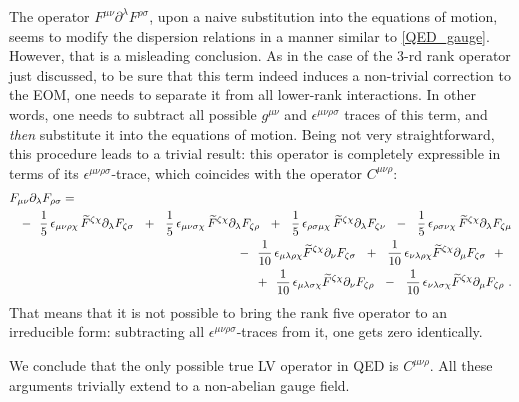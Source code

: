\documentclass[12pt]{revtex4}
\newcommand{\p}{\partial}
\newcommand{\wt}{\widetilde}
\begin{document}
	The operator
$ F^{\mu\nu} \partial^\lambda F^{\rho\sigma} $,
	upon a naive substitution
	into the equations of motion, 
	seems to modify the dispersion relations in a manner similar to \eqref{QED_gauge}.
	However, that is a misleading conclusion.
	As in the case of the 3-rd rank operator just discussed,
	to be sure that this term indeed induces a non-trivial 
	correction to the EOM, one needs to separate it from all
	lower-rank interactions.
	In other words, one needs to subtract all possible 
	$ g^{\mu\nu} $ and $ \epsilon^{\mu\nu\rho\sigma} $ 
	traces of this term, and {\it then} substitute it into the
	equations of motion.
	Being not very straightforward, this procedure leads to a 
	trivial result: this operator is completely expressible
	in terms of its $ \epsilon^{\mu\nu\rho\sigma} $-trace, which
	coincides with the operator $ C^{\mu\nu\rho} $:
\begin{eqnarray*}
\lefteqn{
	F_{\mu\nu} \p_\lambda F_{\rho\sigma} = 
	} &&
	\\
	&&
	-~~ 
	\frac{1}{5}\,\epsilon_{\mu\nu\rho\chi} \,
	\wt{F}^{\zeta\chi}\p_\lambda F_{\zeta\sigma} 
 	~~+~~
	\frac{1}{5}\,\epsilon_{\mu\nu\sigma\chi} \,
	\wt{F}^{\zeta\chi}\p_\lambda F_{\zeta\rho} 
	~~+~~
	\frac{1}{5}\,\epsilon_{\rho\sigma\mu\chi} \,
	\wt{F}^{\zeta\chi}\p_\lambda F_{\zeta\nu} 
 	~~-~~
	\frac{1}{5}\,\epsilon_{\rho\sigma\nu\chi} \,
	\wt{F}^{\zeta\chi}\p_\lambda F_{\zeta\mu}
	\\
	&&
	-~~
	\frac{1}{10}\,\epsilon_{\mu\lambda\rho\chi} 
	\wt{F}^{\zeta\chi}\p_\nu F_{\zeta\sigma} 
	~~+~~
	\frac{1}{10}\,\epsilon_{\nu\lambda\rho\chi} 
	\wt{F}^{\zeta\chi}\p_\mu F_{\zeta\sigma} 
	~~+~~
	\\
	&&
	+~~
	\frac{1}{10}\,\epsilon_{\mu\lambda\sigma\chi} 
	\wt{F}^{\zeta\chi}\p_\nu F_{\zeta\rho} 
	~~-~~
	\frac{1}{10}\,\epsilon_{\nu\lambda\sigma\chi} 
	\wt{F}^{\zeta\chi}\p_\mu F_{\zeta\rho}
	~.
\end{eqnarray*}
	That means that it is not possible to bring the rank five operator
	to an irreducible form: subtracting all
	$ \epsilon^{\mu\nu\rho\sigma} $-traces from it, one gets
	zero identically. 

	We conclude that the only possible true
	LV operator in QED is $ C^{\mu\nu\rho} $.  
	All these arguments trivially extend to a non-abelian gauge
	field.
\end{document}
